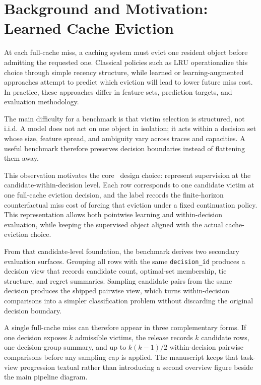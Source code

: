 \section{Background and Motivation: Learned Cache Eviction}
\label{sec:background}

At each full-cache miss, a caching system must evict one resident object before admitting the requested one. Classical policies such as LRU operationalize this choice through simple recency structure, while learned or learning-augmented approaches attempt to predict which eviction will lead to lower future miss cost. In practice, these approaches differ in feature sets, prediction targets, and evaluation methodology.

The main difficulty for a benchmark is that victim selection is structured, not i.i.d. A model does not act on one object in isolation; it acts within a decision set whose size, feature spread, and ambiguity vary across traces and capacities. A useful benchmark therefore preserves decision boundaries instead of flattening them away.

This observation motivates the core \lafc\ design choice: represent supervision at the candidate-within-decision level. Each row corresponds to one candidate victim at one full-cache eviction decision, and the label records the finite-horizon counterfactual miss cost of forcing that eviction under a fixed continuation policy. This representation allows both pointwise learning and within-decision evaluation, while keeping the supervised object aligned with the actual cache-eviction choice.

From that candidate-level foundation, the benchmark derives two secondary evaluation surfaces. Grouping all rows with the same \texttt{decision\_id} produces a decision view that records candidate count, optimal-set membership, tie structure, and regret summaries. Sampling candidate pairs from the same decision produces the shipped pairwise view, which turns within-decision comparisons into a simpler classification problem without discarding the original decision boundary.

A single full-cache miss can therefore appear in three complementary forms. If one decision exposes $k$ admissible victims, the release records $k$ candidate rows, one decision-group summary, and up to $k(k-1)/2$ within-decision pairwise comparisons before any sampling cap is applied. The manuscript keeps that task-view progression textual rather than introducing a second overview figure beside the main pipeline diagram.
